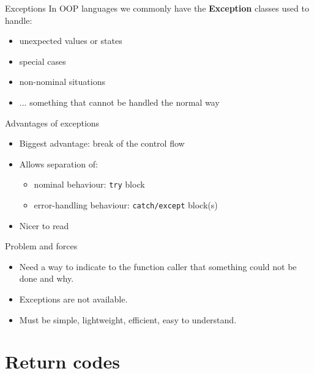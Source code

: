 \documentclass[aspectratio=169,14pt]{beamer}
\begin{document}
\begin{frame}{Exceptions}
In OOP languages we commonly have the \textbf{Exception} classes used to handle:
\begin{itemize}
    \item unexpected values or states
    \item special cases
    \item non-nominal situations
    \item ... something that cannot be handled the normal way
\end{itemize}
\end{frame}



\begin{frame}{Advantages of exceptions}
\begin{itemize}
    \item Biggest advantage: break of the control flow
    \item Allows separation of:\\
    \begin{itemize}
        \item nominal behaviour: \texttt{try} block
        \item error-handling behaviour: \texttt{catch/except} block(s)
    \end{itemize}
    \item Nicer to read
\end{itemize}
\end{frame}



\begin{frame}{Problem and forces}
\begin{itemize}
    \item Need a way to indicate to the function caller that something could not be done and why.
    \item Exceptions are not available.
    \item Must be simple, lightweight, efficient, easy to understand.
\end{itemize}
\end{frame}





\section{Return codes}
\end{document}

